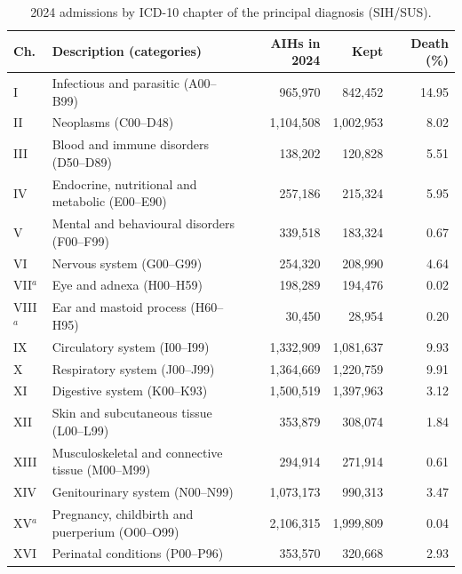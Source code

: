\begin{table}[htbp]
  \centering
  \caption{2024 admissions by ICD-10 chapter of the principal diagnosis (SIH/SUS).}
  \label{tab:sih-chapters}
  \small
  \begin{tabular}{llrrr}
    \toprule
    Ch. & Description (categories) & AIHs in 2024 & Kept & Death (\%) \\
    \midrule
    I     & Infectious and parasitic (A00--B99)                 &   965,970 &   842,452 & 14.95 \\
    II    & Neoplasms (C00--D48)                                & 1,104,508 & 1,002,953 &  8.02 \\
    III   & Blood and immune disorders (D50--D89)               &   138,202 &   120,828 &  5.51 \\
    IV    & Endocrine, nutritional and metabolic (E00--E90)     &   257,186 &   215,324 &  5.95 \\
    V     & Mental and behavioural disorders (F00--F99)         &   339,518 &   183,324 &  0.67 \\
    VI    & Nervous system (G00--G99)                           &   254,320 &   208,990 &  4.64 \\
    VII$^{a}$ & Eye and adnexa (H00--H59)                       &   198,289 &   194,476 &  0.02 \\
    VIII$^{a}$ & Ear and mastoid process (H60--H95)                  &    30,450 &    28,954 &  0.20 \\
    IX    & Circulatory system (I00--I99)                       & 1,332,909 & 1,081,637 &  9.93 \\
    X     & Respiratory system (J00--J99)                       & 1,364,669 & 1,220,759 &  9.91 \\
    XI    & Digestive system (K00--K93)                         & 1,500,519 & 1,397,963 &  3.12 \\
    XII   & Skin and subcutaneous tissue (L00--L99)             &   353,879 &   308,074 &  1.84 \\
    XIII  & Musculoskeletal and connective tissue (M00--M99)    &   294,914 &   271,914 &  0.61 \\
    XIV   & Genitourinary system (N00--N99)                     & 1,073,173 &   990,313 &  3.47 \\
    XV$^{a}$ & Pregnancy, childbirth and puerperium (O00--O99)  & 2,106,315 & 1,999,809 &  0.04 \\
    XVI   & Perinatal conditions (P00--P96)                     &   353,570 &   320,668 &  2.93 \\

\end{tabular}
\end{table}
